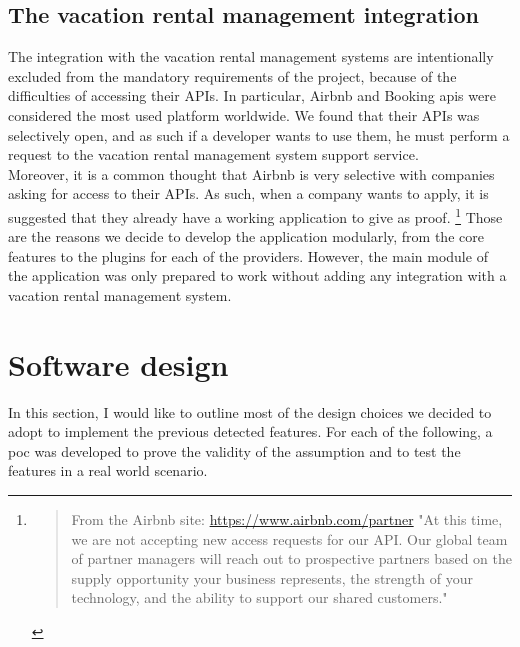 \subsection{The vacation rental management integration}
The integration with the vacation rental management systems are intentionally excluded from the mandatory requirements of the project, because of the difficulties of accessing their APIs. In particular, \gls{Airbnb} and \gls{Booking} \acrshort{api}s were considered the most used platform worldwide. We found that their APIs was selectively open, and as such if a developer wants to use them, he must perform a request to the vacation rental management system support service.
\\ Moreover, it is a common thought that Airbnb is very selective with companies asking for access to their APIs. As such, when a company wants to apply, it is suggested that they already have a working application to give as proof. 
\footnote{
\begin{quote}{From the Airbnb site: \href{https://www.airbnb.com/partner}{https://www.airbnb.com/partner}}
    "At this time, we are not accepting new access requests for our API. Our global team of partner managers will reach out to prospective partners based on the supply opportunity your business represents, the strength of your technology, and the ability to support our shared customers."
\end{quote}
}
Those are the reasons we decide to develop the application modularly, from the core features to the plugins for each of the providers. However, the main module of the application was only prepared to work without adding any integration with a vacation rental management system.

\section{Software design}
In this section, I would like to outline most of the design choices we decided to adopt to implement the previous detected features. For each of the following, a \acrshort{poc} was developed to prove the validity of the assumption and to test the features in a real world scenario. 


